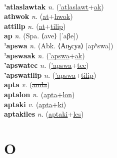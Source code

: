  \label{'atlaslawt} \\
\textbf{'atlaslawtak} \textit{n.} (\hyperref['atlaslawt]{'atlaslawt}+\hyperref[ak]{ak})
 \label{'atlaslawtak} \\
\textbf{athwok} \textit{n.} (\hyperref[at]{at}+\hyperref[hwok]{hwok})
 \label{athwok} \\
\textbf{attilip} \textit{n.} (\hyperref[at]{at}+\hyperref[tilip]{tilip})
 \label{attilip} \\
\textbf{ap} \textit{n.} (Spa. ⟨ave⟩ [ˈaβe])
 \label{ap} \\
\textbf{'apswa} \textit{n.} (Abk. ⟨Аҧсуа⟩ [apʰswa])
 \label{'apswa} \\
\textbf{'apswaak} \textit{n.} (\hyperref['apswa]{'apswa}+\hyperref[ak]{ak})
 \label{'apswaak} \\
\textbf{'apswatec} \textit{n.} (\hyperref['apswa]{'apswa}+\hyperref[tec]{tec})
 \label{'apswatec} \\
\textbf{'apswatilip} \textit{n.} (\hyperref['apswa]{'apswa}+\hyperref[tilip]{tilip})
 \label{'apswatilip} \\
\textbf{apta} \textit{v.} (\hyperref[amla]{\sout{amla}})
 \label{apta} \\
\textbf{aptalon} \textit{n.} (\hyperref[apta]{apta}+\hyperref[lon]{lon})
 \label{aptalon} \\
\textbf{aptaki} \textit{v.} (\hyperref[apta]{apta}+\hyperref[ki]{ki})
 \label{aptaki} \\
\textbf{aptakiles} \textit{n.} (\hyperref[aptaki]{aptaki}+\hyperref[les]{les})
 \label{aptakiles} 

\section{O}

